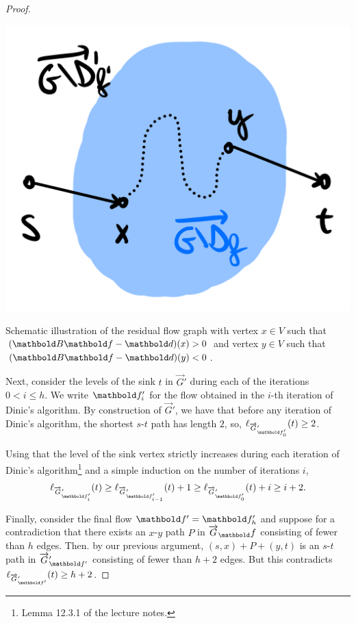 \documentclass[nobib]{tufte-handout}
\newcommand{\flowgraph}{\overrightarrow{G}}
\newcommand{\altflowgraph}{\flowgraph'}
\newcommand{\resflowgraph}{\flowgraph_\vf}
\newcommand{\altresflowgraph}{\altflowgraph_{\vf'}}
\begin{document}
\begin{proof}
\begin{marginfigure}[7\baselineskip]
\includegraphics[width=\textwidth]{assignments/figures/resflowgraph.png}
\caption{Schematic illustration of the residual flow graph with vertex $x \in V$ such that $(\mB\vf - \vd)(x) > 0$ and vertex $y \in V$ such that $(\mB\vf - \vd)(y) < 0$.}\label{fig:1:A:1:1}
\end{marginfigure}

Next, consider the levels of the sink $t$ in $\altflowgraph$ during each of the iterations $0 < i \leq h$. We write $\vf_i'$ for the flow obtained in the $i$-th iteration of Dinic's algorithm. By construction of $\altflowgraph$, we have that before any iteration of Dinic's algorithm, the shortest $s$-$t$ path has length $2$, so, $\ell_{\altflowgraph_{\vf_0'}}(t) \geq 2$.

Using that the level of the sink vertex strictly increases during each iteration of Dinic's algorithm\footnote{Lemma 12.3.1 of the lecture notes.} and a simple induction on the number of iterations $i$, \begin{align*}
    \ell_{\altflowgraph_{\vf_i'}}(t) \geq \ell_{\altflowgraph_{\vf_{i-1}'}}(t) + 1 \geq \ell_{\altflowgraph_{\vf_0'}}(t) + i \geq i + 2.
\end{align*}

Finally, consider the final flow $\vf' = \vf_h'$ and suppose for a contradiction that there exists an $x$-$y$ path $P$ in $\resflowgraph$ consisting of fewer than $h$ edges. Then. by our previous argument, $(s,x) + P + (y,t)$ is an $s$-$t$ path in $\altresflowgraph$ consisting of fewer than $h + 2$ edges. But this contradicts $\ell_{\altflowgraph_{\vf'}}(t) \geq h + 2$.
\end{proof}
\end{document}
